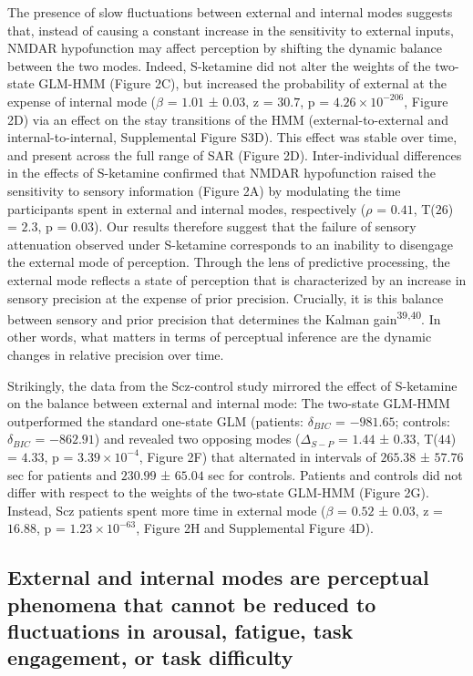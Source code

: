\documentclass[
]{article}
\begin{document}
The presence of slow fluctuations between external and internal modes
suggests that, instead of causing a constant increase in the sensitivity
to external inputs, NMDAR hypofunction may affect perception by shifting
the dynamic balance between the two modes. Indeed, S-ketamine did not
alter the weights of the two-state GLM-HMM (Figure 2C), but increased
the probability of external at the expense of internal mode (\(\beta\) =
\(1.01\) ± \(0.03\), z = \(30.7\), p =
\(\ensuremath{4.26\times 10^{-206}}\), Figure 2D) via an effect on the
stay transitions of the HMM (external-to-external and
internal-to-internal, Supplemental Figure S3D). This effect was stable
over time, and present across the full range of SAR (Figure 2D).
Inter-individual differences in the effects of S-ketamine confirmed that
NMDAR hypofunction raised the sensitivity to sensory information (Figure
2A) by modulating the time participants spent in external and internal
modes, respectively (\(\rho\) = \(0.41\), T(\(26\)) = \(2.3\), p =
\(0.03\)). Our results therefore suggest that the failure of sensory
attenuation observed under S-ketamine corresponds to an inability to
disengage the external mode of perception. Through the lens of
predictive processing, the external mode reflects a state of perception
that is characterized by an increase in sensory precision at the expense
of prior precision. Crucially, it is this balance between sensory and
prior precision that determines the Kalman gain\textsuperscript{39,40}.
In other words, what matters in terms of perceptual inference are the
dynamic changes in relative precision over time.

Strikingly, the data from the Scz-control study mirrored the effect of
S-ketamine on the balance between external and internal mode: The
two-state GLM-HMM outperformed the standard one-state GLM (patients:
\(\delta_{BIC}\) = \(-981.65\); controls: \(\delta_{BIC}\) =
\(-862.91\)) and revealed two opposing modes (\(\Delta_{S-P}\) =
\(1.44\) ± \(0.33\), T(\(44\)) = \(4.33\), p =
\(\ensuremath{3.39\times 10^{-4}}\), Figure 2F) that alternated in
intervals of \(265.38\) ± \(57.76\) sec for patients and \(230.99\) ±
\(65.04\) sec for controls. Patients and controls did not differ with
respect to the weights of the two-state GLM-HMM (Figure 2G). Instead,
Scz patients spent more time in external mode (\(\beta\) = \(0.52\) ±
\(0.03\), z = \(16.88\), p = \(\ensuremath{1.23\times 10^{-63}}\),
Figure 2H and Supplemental Figure 4D).

\subsection{External and internal modes are perceptual phenomena that
cannot be reduced to fluctuations in arousal, fatigue, task engagement,
or task
difficulty}\label{external-and-internal-modes-are-perceptual-phenomena-that-cannot-be-reduced-to-fluctuations-in-arousal-fatigue-task-engagement-or-task-difficulty}
\end{document}
